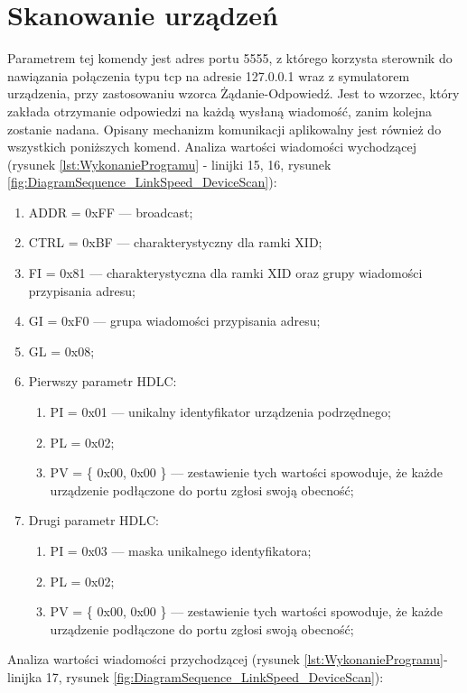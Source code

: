 \section{Skanowanie urządzeń}
Parametrem tej komendy jest adres portu 5555, z którego korzysta sterownik
do nawiązania połączenia typu tcp na adresie 127.0.0.1 wraz z symulatorem urządzenia,
przy zastosowaniu wzorca Żądanie-Odpowiedź. Jest to wzorzec, który zakłada otrzymanie odpowiedzi na każdą wysłaną wiadomość, zanim kolejna zostanie nadana. 
Opisany mechanizm komunikacji aplikowalny jest również do wszystkich poniższych komend.
\newline\newline
Analiza wartości wiadomości wychodzącej 
(rysunek \ref{lst:WykonanieProgramu} - linijki {15, 16}, rysunek \ref{fig:DiagramSequence_LinkSpeed_DeviceScan}):
\begin{enumerate}
    \item ADDR = 0xFF --- broadcast;
    \item CTRL = 0xBF --- charakterystyczny dla ramki XID;
    \item FI = 0x81 --- charakterystyczna dla ramki XID oraz grupy wiadomości przypisania adresu;
    \item GI = 0xF0 --- grupa wiadomości przypisania adresu;
    \item GL = 0x08;
    \item Pierwszy parametr HDLC:
    \begin{enumerate}
        \item PI = 0x01 --- unikalny identyfikator urządzenia podrzędnego;
        \item PL = 0x02;
        \item PV = \{ 0x00, 0x00 \} --- zestawienie tych wartości spowoduje, że każde urządzenie podłączone do portu zgłosi swoją obecność;
    \end{enumerate}
    \item Drugi parametr HDLC:
    \begin{enumerate}
        \item PI = 0x03 --- maska unikalnego identyfikatora;
        \item PL = 0x02;
        \item PV = \{ 0x00, 0x00 \}  --- zestawienie tych wartości spowoduje, że każde urządzenie podłączone do portu zgłosi swoją obecność;
    \end{enumerate}
\end{enumerate}
\bigskip
Analiza wartości wiadomości przychodzącej 
(rysunek \ref{lst:WykonanieProgramu}- linijka 17, rysunek \ref{fig:DiagramSequence_LinkSpeed_DeviceScan}):
